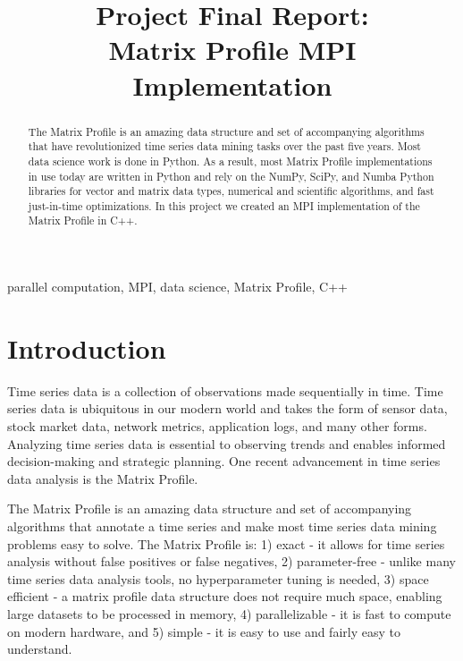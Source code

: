 \documentclass[conference]{IEEEtran}
\begin{document}
\title{Project Final Report:\\Matrix Profile MPI Implementation}

\author{
}


\maketitle
\begin{abstract}
The Matrix Profile is an amazing data structure and set of accompanying algorithms that have revolutionized time series data mining tasks over the past five years.  Most data science work is done in Python.  As a result, most Matrix Profile implementations in use today are written in Python and rely on the NumPy, SciPy, and Numba Python libraries for vector and matrix data types, numerical and scientific algorithms, and fast just-in-time optimizations.  In this project we created an MPI implementation of the Matrix Profile in C++.
\end{abstract}

\begin{IEEEkeywords}
parallel computation, MPI, data science, Matrix Profile, C++
\end{IEEEkeywords}


\section{Introduction}

Time series data is a collection of observations made sequentially in time.  Time series data is ubiquitous in our modern world and takes the form of sensor data, stock market data, network metrics, application logs, and many other forms.  Analyzing time series data is essential to observing trends and enables informed decision-making and strategic planning.  One recent advancement in time series data analysis is the Matrix Profile\cite{MatrixProfile1}. 



The Matrix Profile is an amazing data structure and set of accompanying algorithms that annotate a time series and make most time series data mining problems easy to solve\cite{MatrixProfile2}. The Matrix Profile is:  1) exact - it allows for time series analysis without false positives or false negatives, 2) parameter-free - unlike many time series data analysis tools, no hyperparameter tuning is needed, 3) space efficient - a matrix profile data structure does not require much space, enabling large datasets to be processed in memory, 4) parallelizable - it is fast to compute on modern hardware, and 5) simple - it is easy to use and fairly easy to understand\cite{Keogh}.   
\end{document}
